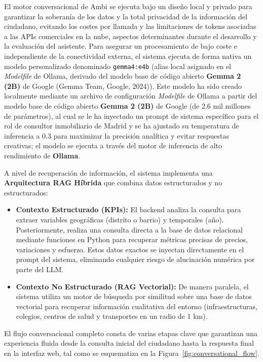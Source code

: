 \documentclass[a4paper,11pt,openany]{book}
\begin{document}
El motor conversacional de Ambi se ejecuta bajo un diseño local y privado para garantizar la soberanía de los datos y la total privacidad de la información del ciudadano, evitando los costes por llamada y las limitaciones de tokens asociadas a las APIs comerciales en la nube, aspectos determinantes durante el desarrollo y la evaluación del asistente. Para asegurar un procesamiento de bajo coste e independiente de la conectividad externa, el sistema ejecuta de forma nativa un modelo personalizado denominado \texttt{gemma4:e4b} (alias local asignado en el \textit{Modelfile} de Ollama, derivado del modelo base de código abierto \textbf{Gemma 2 (2B)} de Google (Gemma Team, Google, 2024)). Este modelo ha sido creado localmente mediante un archivo de configuración \textit{Modelfile} de Ollama a partir del modelo base de código abierto \textbf{Gemma 2 (2B)} de Google (de 2.6 mil millones de parámetros), al cual se le ha inyectado un prompt de sistema específico para el rol de consultor inmobiliario de Madrid y se ha ajustado su temperatura de inferencia a $0.3$ para maximizar la precisión analítica y evitar respuestas creativas; el modelo se ejecuta a través del motor de inferencia de alto rendimiento de \textbf{Ollama}.

A nivel de recuperación de información, el sistema implementa una \textbf{Arquitectura RAG Híbrida} que combina datos estructurados y no estructurados:
\begin{itemize}
    \item \textbf{Contexto Estructurado (KPIs):} El backend analiza la consulta para extraer variables geográficas (distrito o barrio) y temporales (año). Posteriormente, realiza una consulta directa a la base de datos relacional mediante funciones en Python para recuperar métricas precisas de precios, variaciones y esfuerzo. Estos datos exactos se inyectan directamente en el prompt del sistema, eliminando cualquier riesgo de alucinación numérica por parte del LLM.
    \item \textbf{Contexto No Estructurado (RAG Vectorial):} De manera paralela, el sistema utiliza un motor de búsqueda por similitud sobre una base de datos vectorial para recuperar información cualitativa del entorno (infraestructuras, colegios, centros de salud y transportes en un radio de 1 km).
\end{itemize}

El flujo conversacional completo consta de varias etapas clave que garantizan una experiencia fluida desde la consulta inicial del ciudadano hasta la respuesta final en la interfaz web, tal como se esquematiza en la Figura~\ref{fig:conversational_flow}.
\end{document}
